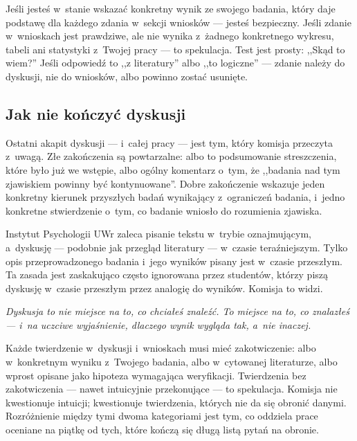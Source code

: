 \documentclass[12pt,a4paper,twoside,openany]{book}
\newcommand{\pullquote}[1]{%
  \par\vspace{12pt}\noindent
  \begin{tcolorbox}[blanker, breakable, left=2.2em, right=1em, top=2pt, bottom=2pt,
    borderline west={2.5pt}{0pt}{accent}]
    {\color{chaptercolor}\Large\itshape #1}
  \end{tcolorbox}\vspace{10pt}\par
}
\begin{document}
\begin{warningbox}
Jeśli jesteś w~stanie wskazać konkretny wynik ze swojego badania, który daje podstawę dla każdego zdania w~sekcji wniosków --- jesteś bezpieczny. Jeśli zdanie w~wnioskach jest prawdziwe, ale nie wynika z~żadnego konkretnego wykresu, tabeli ani statystyki z~Twojej pracy --- to spekulacja. Test jest prosty: ,,Skąd to wiem?'' Jeśli odpowiedź to ,,z literatury'' albo ,,to logiczne'' --- zdanie należy do dyskusji, nie do wniosków, albo powinno zostać usunięte.
\end{warningbox}

\subsection{Jak nie kończyć dyskusji}

Ostatni akapit dyskusji --- i~całej pracy --- jest tym, który komisja przeczyta z~uwagą. Złe zakończenia są powtarzalne: albo to podsumowanie streszczenia, które było już we wstępie, albo ogólny komentarz o~tym, że ,,badania nad tym zjawiskiem powinny być kontynuowane''. Dobre zakończenie wskazuje jeden konkretny kierunek przyszłych badań wynikający z~ograniczeń badania, i~jedno konkretne stwierdzenie o~tym, co badanie wniosło do rozumienia zjawiska.

Instytut Psychologii UWr zaleca pisanie tekstu w~trybie oznajmującym, a~dyskusję --- podobnie jak przegląd literatury --- w~czasie teraźniejszym. Tylko opis przeprowadzonego badania i~jego wyników pisany jest w~czasie przeszłym. Ta zasada jest zaskakująco często ignorowana przez studentów, którzy piszą dyskusję w~czasie przeszłym przez analogię do wyników. Komisja to widzi.

\pullquote{Dyskusja to nie miejsce na to, co chciałeś znaleźć. To miejsce na to, co znalazłeś --- i~na uczciwe wyjaśnienie, dlaczego wynik wygląda tak, a~nie inaczej.}

\begin{keyinsight}
Każde twierdzenie w~dyskusji i~wnioskach musi mieć zakotwiczenie: albo w~konkretnym wyniku z~Twojego badania, albo w~cytowanej literaturze, albo wprost opisane jako hipoteza wymagająca weryfikacji. Twierdzenia bez zakotwiczenia --- nawet intuicyjnie przekonujące --- to spekulacja. Komisja nie kwestionuje intuicji; kwestionuje twierdzenia, których nie da się obronić danymi. Rozróżnienie między tymi dwoma kategoriami jest tym, co oddziela prace oceniane na piątkę od tych, które kończą się długą listą pytań na obronie.
\end{keyinsight}
\end{document}
